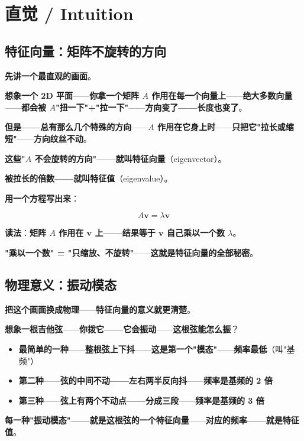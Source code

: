\section{直觉 / Intuition}

\subsection{特征向量：矩阵不旋转的方向}

\textbf{先讲一个最直观的画面}。

\textbf{想象一个 2D 平面}——\textbf{你拿一个矩阵 $A$ 作用在每一个向量上}——\textbf{绝大多数向量}——\textbf{都会被 $A$"扭一下"+"拉一下"}——\textbf{方向变了——长度也变了}。

\textbf{但是——总有那么几个特殊的方向}——\textbf{$A$ 作用在它身上时}——\textbf{只把它"拉长或缩短"}——\textbf{方向纹丝不动}。

\textbf{这些"$A$ 不会旋转的方向"——就叫特征向量}（eigenvector）。

\textbf{被拉长的倍数——就叫特征值}（eigenvalue）。

\textbf{用一个方程写出来}：

\[
A \bm{v} = \lambda \bm{v}
\]

\textbf{读法}：\textbf{矩阵 $A$ 作用在 $\bm{v}$ 上——结果等于 $\bm{v}$ 自己乘以一个数 $\lambda$}。

\textbf{"乘以一个数" = "只缩放、不旋转"}——\textbf{这就是特征向量的全部秘密}。

\subsection{物理意义：振动模态}

\textbf{把这个画面换成物理}——\textbf{特征向量的意义就更清楚}。

\textbf{想象一根吉他弦}——\textbf{你拨它——它会振动}——\textbf{这根弦能怎么振}？

\begin{itemize}
\item \textbf{最简单的一种}——\textbf{整根弦上下抖}——\textbf{这是第一个"模态"}——\textbf{频率最低}（叫"基频"）
\item \textbf{第二种}——\textbf{弦的中间不动——左右两半反向抖}——\textbf{频率是基频的 2 倍}
\item \textbf{第三种}——\textbf{弦上有两个不动点——分成三段}——\textbf{频率是基频的 3 倍}
\end{itemize}

\textbf{每一种"振动模态"——就是这根弦的一个特征向量}——\textbf{对应的频率——就是特征值}。

